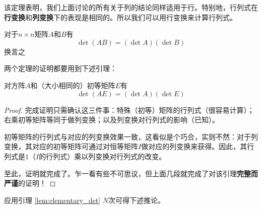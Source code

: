 该定理表明，我们上面讨论的所有关于列的结论同样适用于行。特别地，行列式在{\bf 行变换}和{\bf 列变换}下的表现是相同的。所以我们可以用行变换来计算行列式。

\begin{theorem}[乘积的行列式]\label{thm:det_prod}
  对于$n\times n$矩阵$A$和$B$有\[\det (AB) = (\det A)(\det B)\]
  换言之
  \begin{center}
  \end{center}
\end{theorem}

两个定理的证明都要用到下述引理：
\begin{lemma}\label{lem:elementary_det}
  对方阵$A$和（大小相同的）初等矩阵$E$有\[\det (AE) = (\det A)(\det E)\]
\end{lemma}
\begin{proof}
  完成证明只需确认这三件事：特殊（初等）矩阵的行列式（很容易计算）；右乘初等矩阵等同于做列变换；以及列变换对行列式的影响（已知）。

  初等矩阵的行列式与对应的列变换效果一致，这看似是个巧合，实则不然：对于列变换，其对应的初等矩阵可通过对恒等矩阵$I$做对应的列变换来获得。因此，其行列式是$1$（$I$的行列式）乘以列变换对行列式的改变。

  至此，证明就完成了。乍一看有些不可思议，但上面几段就完成了对该引理{\bf 完整而严谨}的证明！
\end{proof}

应用引理 \ref{lem:elementary_det} $N$次可得下述推论。

